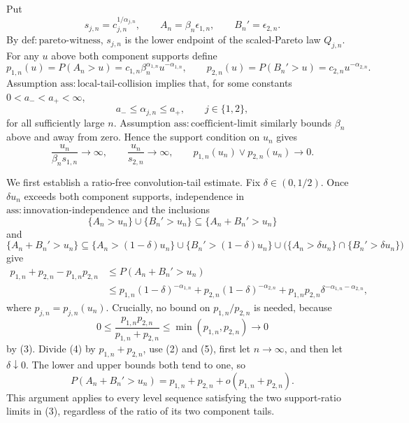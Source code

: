 Put
\[
s_{j,n}=c_{j,n}^{1/\alpha_{j,n}},\qquad
A_n=\beta_n\epsilon_{1,n},\qquad B_n'=\epsilon_{2,n}.
\]
By \(\mathrm{def{:}pareto\text{-}witness}\), \(s_{j,n}\) is the lower endpoint of the scaled-Pareto law \(Q_{j,n}\).  For any \(u\) above both component supports define
\[
p_{1,n}(u)=P(A_n>u)
=c_{1,n}\beta_n^{\alpha_{1,n}}u^{-\alpha_{1,n}},
\qquad
p_{2,n}(u)=P(B_n'>u)=c_{2,n}u^{-\alpha_{2,n}}.
\tag{1}
\]
Assumption \(\mathrm{ass{:}local\text{-}tail\text{-}collision}\) implies that, for some constants \(0<a_-<a_+<\infty\),
\[
a_-\leq\alpha_{j,n}\leq a_+,
\qquad j\in\{1,2\},
\tag{2}
\]
for all sufficiently large \(n\).  Assumption \(\mathrm{ass{:}coefficient\text{-}limit}\) similarly bounds \(\beta_n\) above and away from zero.  Hence the support condition on \(u_n\) gives
\[
\frac{u_n}{\beta_ns_{1,n}}\to\infty,
\qquad
\frac{u_n}{s_{2,n}}\to\infty,
\qquad
p_{1,n}(u_n)\vee p_{2,n}(u_n)\to0.
\tag{3}
\]

We first establish a ratio-free convolution-tail estimate.  Fix \(\delta\in(0,1/2)\).  Once \(\delta u_n\) exceeds both component supports, independence in \(\mathrm{ass{:}innovation\text{-}independence}\) and the inclusions
\[
\{A_n>u_n\}\cup\{B_n'>u_n\}
\subseteq\{A_n+B_n'>u_n\}
\]
and
\[
\{A_n+B_n'>u_n\}
\subseteq
\{A_n>(1-\delta)u_n\}\cup
\{B_n'>(1-\delta)u_n\}\cup
\bigl(\{A_n>\delta u_n\}\cap\{B_n'>\delta u_n\}\bigr)
\]
give
\[
\begin{split}
p_{1,n}+p_{2,n}-p_{1,n}p_{2,n}
&\leq P(A_n+B_n'>u_n)\\
&\leq p_{1,n}(1-\delta)^{-\alpha_{1,n}}
 +p_{2,n}(1-\delta)^{-\alpha_{2,n}}
 +p_{1,n}p_{2,n}\delta^{-\alpha_{1,n}-\alpha_{2,n}},
\end{split}
\tag{4}
\]
where \(p_{j,n}=p_{j,n}(u_n)\).  Crucially, no bound on \(p_{1,n}/p_{2,n}\) is needed, because
\[
0\leq\frac{p_{1,n}p_{2,n}}{p_{1,n}+p_{2,n}}
\leq\min(p_{1,n},p_{2,n})\to0
\tag{5}
\]
by (3).  Divide (4) by \(p_{1,n}+p_{2,n}\), use (2) and (5), first let \(n\to\infty\), and then let \(\delta\downarrow0\).  The lower and upper bounds both tend to one, so
\[
P(A_n+B_n'>u_n)
=p_{1,n}+p_{2,n}+o(p_{1,n}+p_{2,n}).
\tag{6}
\]
This argument applies to every level sequence satisfying the two support-ratio limits in (3), regardless of the ratio of its two component tails.

